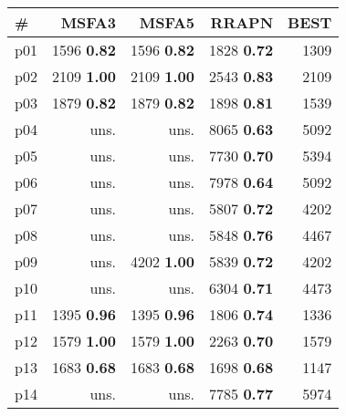 \begin{tabular}{lrrrr}
\toprule
\textbf{\#} & \textbf{MSFA3} & \textbf{MSFA5} & \textbf{RRAPN} & \textbf{BEST}\\
\midrule
\multicolumn{1}{l|}{p01} & {\footnotesize 1596} \textbf{0.82} & {\footnotesize 1596} \textbf{0.82} & {\footnotesize 1828} \textbf{0.72} & \multicolumn{1}{|r}{1309}\\
\multicolumn{1}{l|}{p02} & {\footnotesize 2109} \textbf{1.00} & {\footnotesize 2109} \textbf{1.00} & {\footnotesize 2543} \textbf{0.83} & \multicolumn{1}{|r}{2109}\\
\multicolumn{1}{l|}{p03} & {\footnotesize 1879} \textbf{0.82} & {\footnotesize 1879} \textbf{0.82} & {\footnotesize 1898} \textbf{0.81} & \multicolumn{1}{|r}{1539}\\
\multicolumn{1}{l|}{p04} & uns. & uns. & {\footnotesize 8065} \textbf{0.63} & \multicolumn{1}{|r}{5092}\\
\multicolumn{1}{l|}{p05} & uns. & uns. & {\footnotesize 7730} \textbf{0.70} & \multicolumn{1}{|r}{5394}\\
\multicolumn{1}{l|}{p06} & uns. & uns. & {\footnotesize 7978} \textbf{0.64} & \multicolumn{1}{|r}{5092}\\
\multicolumn{1}{l|}{p07} & uns. & uns. & {\footnotesize 5807} \textbf{0.72} & \multicolumn{1}{|r}{4202}\\
\multicolumn{1}{l|}{p08} & uns. & uns. & {\footnotesize 5848} \textbf{0.76} & \multicolumn{1}{|r}{4467}\\
\multicolumn{1}{l|}{p09} & uns. & {\footnotesize 4202} \textbf{1.00} & {\footnotesize 5839} \textbf{0.72} & \multicolumn{1}{|r}{4202}\\
\multicolumn{1}{l|}{p10} & uns. & uns. & {\footnotesize 6304} \textbf{0.71} & \multicolumn{1}{|r}{4473}\\
\multicolumn{1}{l|}{p11} & {\footnotesize 1395} \textbf{0.96} & {\footnotesize 1395} \textbf{0.96} & {\footnotesize 1806} \textbf{0.74} & \multicolumn{1}{|r}{1336}\\
\multicolumn{1}{l|}{p12} & {\footnotesize 1579} \textbf{1.00} & {\footnotesize 1579} \textbf{1.00} & {\footnotesize 2263} \textbf{0.70} & \multicolumn{1}{|r}{1579}\\
\multicolumn{1}{l|}{p13} & {\footnotesize 1683} \textbf{0.68} & {\footnotesize 1683} \textbf{0.68} & {\footnotesize 1698} \textbf{0.68} & \multicolumn{1}{|r}{1147}\\
\multicolumn{1}{l|}{p14} & uns. & uns. & {\footnotesize 7785} \textbf{0.77} & \multicolumn{1}{|r}{5974}\\

\end{tabular}
